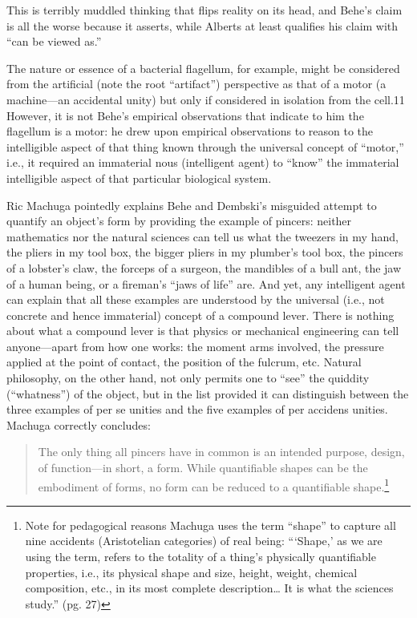 This is terribly muddled thinking that flips reality on its head, and Behe’s claim is all the worse because it asserts, while Alberts at least qualifies his claim with “can be viewed as.”

The nature or essence of a bacterial flagellum, for example, might be considered from the artificial (note the root “artifact”) perspective as that of a motor (a machine—an accidental unity) but only if considered in isolation from the cell.11 However, it is not Behe’s empirical observations that indicate to him the flagellum is a motor: he drew upon empirical observations to reason to the intelligible aspect of that thing known through the universal concept of “motor,” i.e., it required an immaterial nous (intelligent agent) to “know” the immaterial intelligible aspect of that particular biological system.

Ric Machuga pointedly explains Behe and Dembski’s misguided attempt to quantify an object’s form by providing the example of pincers: neither mathematics nor the natural sciences can tell us what the tweezers in my hand, the pliers in my tool box, the bigger pliers in my plumber’s tool box, the pincers of a lobster’s claw, the forceps of a surgeon, the mandibles of a bull ant, the jaw of a human being, or a fireman’s “jaws of life” are. And yet, any intelligent agent can explain that all these examples are understood by the universal (i.e., not concrete and hence immaterial) concept of a compound lever. There is nothing about what a compound lever is that physics or mechanical engineering can tell anyone—apart from how one works: the moment arms involved, the pressure applied at the point of contact, the position of the fulcrum, etc. Natural philosophy, on the other hand, not only permits one to “see” the quiddity (“whatness”) of the object, but in the list provided it can distinguish between the three examples of per se unities and the five examples of per accidens unities. Machuga correctly concludes:

\begin{quote}
The only thing all pincers have in common is an intended purpose, design, of function—in short, a form. While quantifiable shapes can be the embodiment of forms, no form can be reduced to a quantifiable shape.\cite[pg.~162]{machuga}\footnote{Note for pedagogical reasons Machuga uses the term “shape” to capture all nine accidents (Aristotelian categories) of real being: “‘Shape,’ as we are using the term, refers to the totality of a thing’s physically quantifiable properties, i.e., its physical shape and size, height, weight, chemical composition, etc., in its most complete description… It is what the sciences study.” (pg. 27)}
\end{quote}


